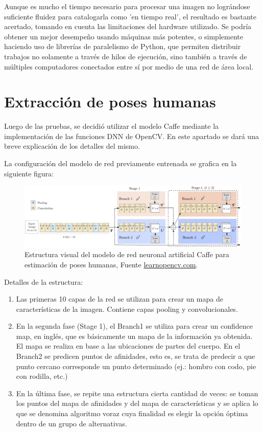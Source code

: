 \documentclass[a4paper,12pt,oneside,spanish]{book}
\begin{document}
Aunque es mucho el tiempo necesario para procesar una imagen no lográndose suficiente fluidez para catalogarla como 'en tiempo real', el resultado es bastante acertado, tomando en cuenta las limitaciones del hardware utilizado. Se podría obtener un mejor desempeño usando máquinas más potentes, o simplemente haciendo uso de librerías de paralelismo de Python, que permiten distribuir trabajos no solamente a través de hilos de ejecución, sino también a través de múltiples computadores conectados entre sí por medio de una red de área local.\par


\section{Extracción de poses humanas}\label{extraccionpose}
Luego de las pruebas, se decidió utilizar el modelo Caffe mediante la implementación de las funciones DNN de OpenCV. En este apartado se dará una breve explicación de los detalles del mismo.\par

La configuración del modelo de red previamente entrenada se grafica en la siguiente figura:
\begin{figure}[h!]
	\includegraphics[width=450pt]{Imagenes/network_pose1.jpg}
	\centering	
	\caption{Estructura visual del modelo de red neuronal artificial Caffe para estimación de poses humanas, Fuente \url{learnopencv.com}.}
	\label{fig:network_pose1}
\end{figure}	

Detalles de la estructura:
\begin{enumerate}
	\item Las primeras 10 capas de la red se utilizan para crear un mapa de características de la imagen. Contiene capas pooling y convolucionales.
	\item En la segunda fase (Stage 1), el Branch1 se utiliza para crear un confidence map, en inglés, que es básicamente un mapa de la información ya obtenida. El mapa se realiza en base a las ubicaciones de partes del cuerpo. En el Branch2 se predicen puntos de afinidades, esto es, se trata de predecir a que punto cercano corresponde un punto determinado (ej.: hombro con codo, pie con rodilla, etc.)
	\item En la última fase, se repite una estructura cierta cantidad de veces: se toman los puntos del mapa de afinidades y del mapa de características y se aplica lo que se denomina algoritmo voraz cuya finalidad es elegir la opción óptima dentro de un grupo de alternativas.
\end{enumerate}
\end{document}
